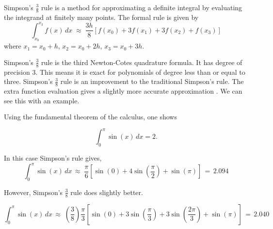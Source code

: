 \documentclass[12pt]{article}
\begin{document}
Simpson's $\frac{3}{8}$ rule is a method for approximating a
definite integral by evaluating the integrand at finitely many
points.  The formal rule is given by
\[
\int_{x_{0}}^{x_{3}}f(x)\,dx\;\approx\;\frac{3h}{8}\left[f(x_{0})+3f(x_{1})+3f(x_{2})+f(x_{3})\right]
\]
where $x_1=x_0+h$, $x_2=x_0+2h$, $x_3=x_0+3h$.



Simpson's $\frac{3}{8}$ rule is the third Newton-Cotes quadrature
formula. It has degree of precision 3. This means it is exact for
polynomials of degree less than or equal to three. Simpson's
$\frac{3}{8}$ rule is an improvement to the traditional Simpson's
rule. The extra function evaluation gives a slightly more accurate
approximation . We can see this with an example.





Using the fundamental theorem of the calculus, one shows

\[
\int_{0}^{\pi}\sin(x)\,dx =2.
\]

In this case Simpson's rule gives,
\[
\int_{0}^{\pi}\sin(x)\,dx\,\approx\;\frac{\pi}{6}\left[\sin(0)+4\sin\left(\frac{\pi}{2}\right)+\sin(\pi)\right]\,=\,2.094
\]


However, Simpson's $\frac{3}{8}$ rule does slightly better.

\[
\int_{0}^{\pi}\sin(x)\,dx\,\approx\;\left(\frac{3}{8}\right)\frac{\pi}{3}\left[\sin(0)+3\sin\left(\frac{\pi}{3}\right)+3\sin\left(\frac{2\pi}{3}\right)+\sin(\pi)\right]\,=\,2.040
\]
\end{document}
